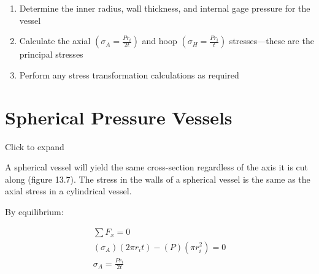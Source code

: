 \documentclass[
  letterpaper,
  DIV=11,
  numbers=noendperiod]{scrreprt}
\begin{document}
\begin{tcolorbox}[enhanced jigsaw, breakable, opacityback=0, toptitle=1mm, left=2mm, colback=white, opacitybacktitle=0.6, colframe=quarto-callout-note-color-frame, titlerule=0mm, arc=.35mm, leftrule=.75mm, bottomtitle=1mm, colbacktitle=quarto-callout-note-color!10!white, rightrule=.15mm, title={Step-by-step: Cylindrical thin-walled pressure vessels}, bottomrule=.15mm, toprule=.15mm, coltitle=black]

\begin{enumerate}
\def\labelenumi{\arabic{enumi}.}
\item
  Determine the inner radius, wall thickness, and internal gage pressure
  for the vessel
\item
  Calculate the axial \(\left(\sigma_A=\frac{P r_i}{2 t}\right)\) and
  hoop \(\left(\sigma_H=\frac{P r_i}{t}\right)\) stresses---these are
  the principal stresses
\item
  Perform any stress transformation calculations as required
\end{enumerate}

\end{tcolorbox}

\section{Spherical Pressure Vessels}\label{spherical-pressure-vessels}

Click to expand

A spherical vessel will yield the same cross-section regardless of the
axis it is cut along (figure 13.7). The stress in the walls of a
spherical vessel is the same as the axial stress in a cylindrical
vessel.

By equilibrium:

\[
\begin{gathered}
\sum F_x=0 \\
\left(\sigma_A\right)\left(2 \pi r_i t\right)-(P)\left(\pi r_i^2\right)=0 \\
\sigma_A=\frac{P r_i}{2 t}
\end{gathered}
\]
\end{document}
